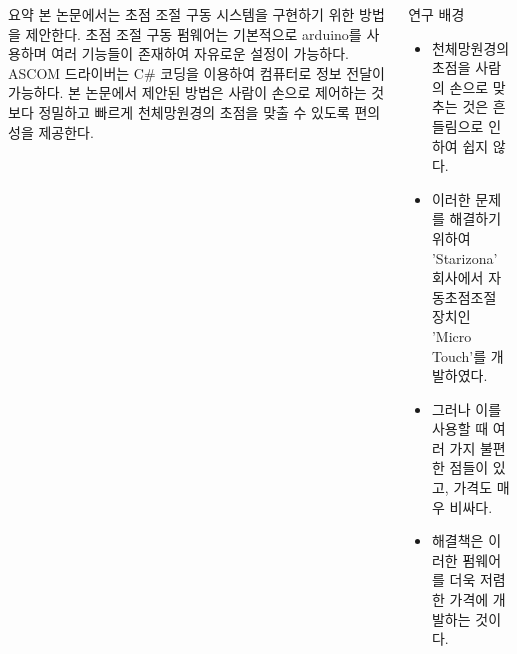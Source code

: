\documentclass{gshs_poster_beamer}
\begin{document}
\pagestyle{fancy}
\maketitle

\begin{columns}[T]



\begin{posterbox}[colbacktitle=orange!70,coltitle=black,colback=orange!5]{요약}
본 논문에서는 초점 조절 구동 시스템을 구현하기 위한 방법을 제안한다. 초점 조절 구동 펌웨어는 기본적으로 arduino를 사용하며 여러 기능들이 존재하여 자유로운 설정이 가능하다. ASCOM 드라이버는 C\# 코딩을 이용하여 컴퓨터로 정보 전달이 가능하다. 본 논문에서 제안된 방법은 사람이 손으로 제어하는 것보다 정밀하고 빠르게 천체망원경의 초점을 맞출 수 있도록 편의성을 제공한다.
\end{posterbox}

\vspace{1em}

\begin{posterbox}[colbacktitle=magenta!60,coltitle=black,colback=magenta!5]{연구 배경}
\begin{itemize}
	\item 천체망원경의 초점을 사람의 손으로 맞추는 것은 흔들림으로 인하여 쉽지 않다.
	\item 이러한 문제를 해결하기 위하여 'Starizona' 회사에서 자동초점조절 장치인 'Micro Touch'를 개발하였다.
	\item 그러나 이를 사용할 때 여러 가지 불편한 점들이 있고, 가격도 매우 비싸다.
	\item 해결책은 이러한 펌웨어를 더욱 저렴한 가격에 개발하는 것이다.
\end{itemize}
\end{posterbox}

\vspace{1em}


\end{columns}
\end{document}
